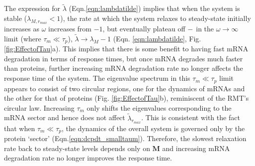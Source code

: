 \documentclass[10pt]{article}
\begin{document}
The expression for $\tilde{\lambda}$ (Eqn.\ref{eqn:lambdatilde}) implies that when the system is stable ($\lambda_{M,r_{max}} < 1$), the rate at which the system relaxes to steady-state initially increases as $\omega$ increases from $-1$, but eventually plateau off $\--$ in the $\omega \to \infty$ limit (where $\tau_m \ll \tau_p$), $\tilde{\lambda} \to \lambda_M - 1$ (Eqn. \ref{eqn:lambdatilde}, Fig. \ref{fig:EffectofTau}a). This implies that there is some benefit to having fast mRNA degradation in terms of response times, but once mRNA degrades much faster than proteins, further increasing mRNA degradation rate no longer affects the response time of the system. The eigenvalue spectrum in this $\tau_m \ll \tau_p$ limit appears to consist of two circular regions, one for the dynamics of mRNAs and the other for that of proteins (Fig. \ref{fig:EffectofTau}b), reminiscent of the RMT's circular law. Increasing $\tau_m$ only shifts the eigenvalues corresponding to the mRNA sector and hence does not affect $\tilde{\lambda}_{r_{max}}$. This is consistent with the fact that when $\tau_m \ll \tau_p$, the dynamics of the overall system is governed only by the protein `sector' (Eqn.\ref{eqn:dcpdt_smalltaum}). Therefore, the slowest relaxation rate back to steady-state levels depends only on $\mathbf{M}$ and increasing mRNA degradation rate no longer improves the response time. 



\end{document}
